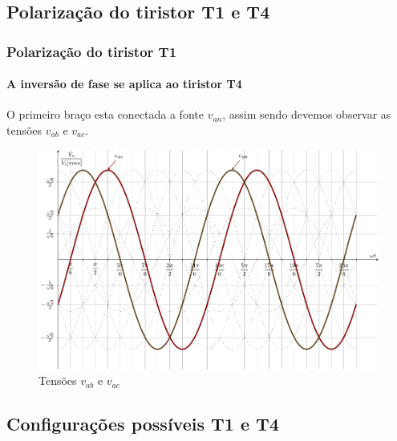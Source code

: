 \documentclass[aspectratio=43]{beamer}
\begin{document}
\subsection{Polarização do tiristor T1 e T4}
\begin{frame}
	\frametitle{Polarização do tiristor T1}
	\framesubtitle{A inversão de fase se aplica ao tiristor T4}

O primeiro braço esta conectada a fonte $v_{an}$, assim sendo devemos observar as tensões $v_{ab}$ e $v_{ac}$.
\begin{figure}
	\centering
	\includegraphics[width=0.6\linewidth]{figuras/SenosDrawSEQnT1T4}
	\caption{Tensões $v_{ab}$ e $v_{ac}$}
	\label{fig:SenosDrawSEQnT1T4}
\end{figure}
	
\end{frame}

\subsection{Configurações possíveis T1 e T4}
\end{document}

